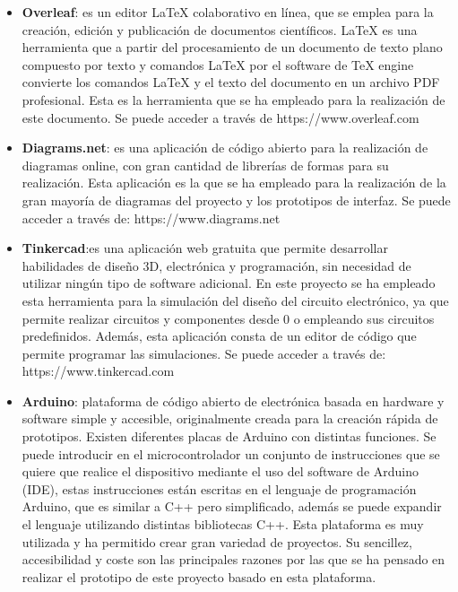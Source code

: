 \begin{itemize}
\item \textbf{Overleaf}\cite{Overleaf}: es un editor LaTeX colaborativo en línea, que se emplea para la creación, edición y publicación de documentos científicos. LaTeX es una herramienta que a partir del procesamiento de un documento de texto plano compuesto por texto y comandos LaTeX por el software de TeX engine convierte los comandos LaTeX y el texto del documento en un archivo PDF profesional. Esta es la herramienta que se ha empleado para la realización de este documento. Se puede acceder a través de https://www.overleaf.com  %

\item \textbf{Diagrams.net}\cite{Diagrams.net}: es una aplicación de código abierto para la realización de diagramas online, con gran cantidad de librerías de formas para su realización. Esta aplicación es la que se ha empleado para la realización de la gran mayoría de diagramas del proyecto y los prototipos de interfaz. Se puede acceder a través de: https://www.diagrams.net %

\item \textbf{Tinkercad}\cite{Tinkercad}:es una aplicación web gratuita que permite desarrollar habilidades de diseño 3D, electrónica y programación, sin necesidad de utilizar ningún tipo de software adicional. En este proyecto se ha empleado esta herramienta para la simulación del diseño del circuito electrónico, ya que permite realizar circuitos y componentes desde 0 o empleando sus circuitos predefinidos. Además, esta aplicación consta de un editor de código que permite programar las simulaciones. Se puede acceder a través de: https://www.tinkercad.com %

\item \textbf{Arduino}\cite{Arduino1, Arduino2}: plataforma de código abierto de electrónica basada en hardware y software simple y accesible, originalmente creada para la creación rápida de prototipos. Existen diferentes placas de Arduino con distintas funciones. Se puede introducir en el microcontrolador un conjunto de instrucciones que se quiere que realice el dispositivo mediante el uso del software de Arduino (IDE), estas instrucciones están escritas en el lenguaje de programación Arduino, que es similar a C++ pero simplificado, además se puede expandir el lenguaje utilizando distintas bibliotecas C++. Esta plataforma es muy utilizada y ha permitido crear gran variedad de proyectos. Su sencillez, accesibilidad y coste son las principales razones por las que se ha pensado en realizar el prototipo de este proyecto basado en esta plataforma. 


\end{itemize}
